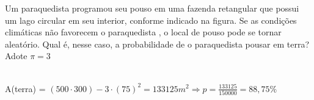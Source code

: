 \begin{ex}
Um paraquedista programou seu pouso em uma fazenda retangular que possui um lago circular em seu interior, conforme indicado na figura. Se as condições climáticas não favorecem o paraquedista , o local de pouso pode se tornar aleatório. Qual é, nesse caso, a probabilidade de o paraquedista pousar em terra?\\
Adote $\pi = 3$
\begin{center}
    
\end{center}
  \begin{sol}
    \phantom{A} \\
    A(terra) = $(500\cdot300) - 3\cdot(75)^2= 133125  m^2 \Longrightarrow p=\frac{133125}{150000}=88,75\%$ 
  \end{sol}
\end{ex}